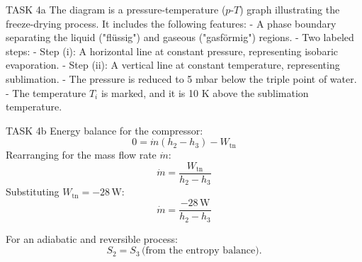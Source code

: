 TASK 4a  
The diagram is a pressure-temperature (\( p \)-\( T \)) graph illustrating the freeze-drying process. It includes the following features:  
- A phase boundary separating the liquid ("flüssig") and gaseous ("gasförmig") regions.  
- Two labeled steps:  
  - Step (i): A horizontal line at constant pressure, representing isobaric evaporation.  
  - Step (ii): A vertical line at constant temperature, representing sublimation.  
- The pressure is reduced to 5 mbar below the triple point of water.  
- The temperature \( T_i \) is marked, and it is 10 K above the sublimation temperature.  

TASK 4b  
Energy balance for the compressor:  
\[
0 = \dot{m} (h_2 - h_3) - W_{\text{tn}}
\]
Rearranging for the mass flow rate \( \dot{m} \):  
\[
\dot{m} = \frac{W_{\text{tn}}}{h_2 - h_3}
\]
Substituting \( W_{\text{tn}} = -28 \, \text{W} \):  
\[
\dot{m} = \frac{-28 \, \text{W}}{h_2 - h_3}
\]

For an adiabatic and reversible process:  
\[
S_2 = S_3 \, \text{(from the entropy balance).}
\]
